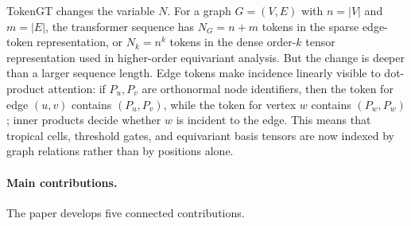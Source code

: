 \documentclass[11pt]{article}
\begin{document}
TokenGT changes the variable $N$.  For a graph $G=(V,E)$ with $n=|V|$ and $m=|E|$, the transformer sequence has $N_G=n+m$ tokens in the sparse edge-token representation, or $N_k=n^k$ tokens in the dense order-$k$ tensor representation used in higher-order equivariant analysis.  But the change is deeper than a larger sequence length.  Edge tokens make incidence linearly visible to dot-product attention: if $P_u,P_v$ are orthonormal node identifiers, then the token for edge $(u,v)$ contains $(P_u,P_v)$, while the token for vertex $w$ contains $(P_w,P_w)$; inner products decide whether $w$ is incident to the edge.  This means that tropical cells, threshold gates, and equivariant basis tensors are now indexed by graph relations rather than by positions alone.

\paragraph{Main contributions.}
The paper develops five connected contributions.
\end{document}
